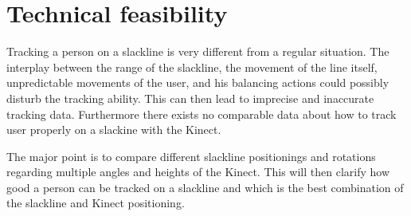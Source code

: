 \section{Technical feasibility}\label{5_1_technicalFeasibility}
Tracking a person on a slackline is very different from a regular situation. The interplay between the range of the slackline, the movement of the line itself, unpredictable movements of the user, and his balancing actions could possibly disturb the tracking ability. This can then lead to imprecise and inaccurate tracking data. Furthermore there exists no comparable data about how to track user properly on a slackine with the Kinect.

The major point is to compare different slackline positionings and rotations regarding multiple angles and heights of the Kinect. This will then clarify how good a person can be tracked on a slackline and which is the best combination of the slackline and Kinect positioning.

